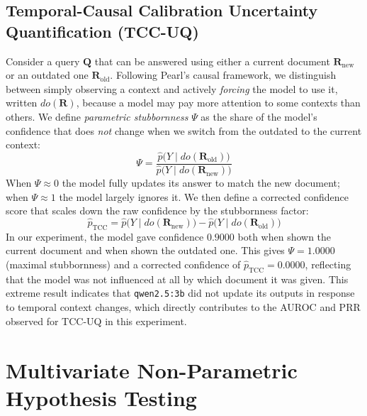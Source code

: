 \documentclass[twoside]{article}
\begin{document}
\subsection{Temporal-Causal Calibration Uncertainty Quantification (TCC-UQ)}

Consider a query $\mathbf{Q}$ that can be answered using either a
current document $\mathbf{R}_{\mathrm{new}}$ or an outdated one
$\mathbf{R}_{\mathrm{old}}$. Following Pearl's causal framework, we
distinguish between simply observing a context and actively
\emph{forcing} the model to use it, written $do(\mathbf{R})$, because
a model may pay more attention to some contexts than others. We define \emph{parametric stubbornness} $\Psi$ as the share of the
model's confidence that does \emph{not} change when we switch from the
outdated to the current context:
\begin{equation}
  \Psi = \frac{\hat{p}\bigl(Y\mid do(\mathbf{R}_{\mathrm{old}})\bigr)}
       {\hat{p}\bigl(Y\mid do(\mathbf{R}_{\mathrm{new}})\bigr)}
  \label{eq:stubbornness}
\end{equation}
When $\Psi \approx 0$ the model fully updates its answer to match the
new document; when $\Psi \approx 1$ the model largely ignores it. We
then define a corrected confidence score that scales down the raw
confidence by the stubbornness factor:
\begin{equation}
  \hat{p}_{\mathrm{TCC}}
  = \hat{p}\bigl(Y\mid do(\mathbf{R}_{\mathrm{new}})\bigr)
    - \hat{p}\bigl(Y\mid do(\mathbf{R}_{\mathrm{old}})\bigr)
  \label{eq:safe_conf}
\end{equation}
In our experiment, the model gave confidence $0.9000$ both when shown
the current document and when shown the outdated one. This gives
$\Psi = 1.0000$ (maximal stubbornness) and a corrected confidence of
$\hat{p}_{\mathrm{TCC}} = 0.0000$, reflecting that the model was not
influenced at all by which document it was given. This extreme result
indicates that \texttt{qwen2.5:3b} did not update its outputs in
response to temporal context changes, which directly contributes to
the AUROC and PRR observed for TCC-UQ in this experiment.

\section{Multivariate Non-Parametric Hypothesis Testing}
\end{document}
